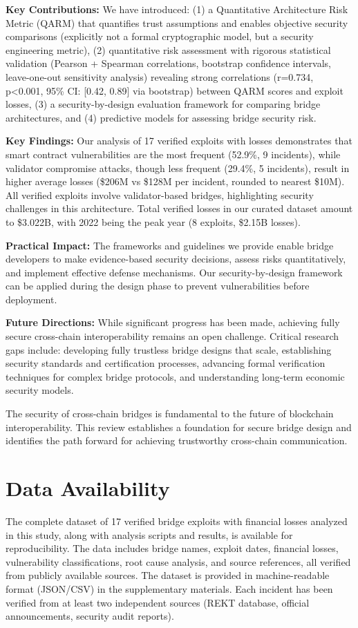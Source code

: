\documentclass[runningheads]{llncs}
\begin{document}
\textbf{Key Contributions:} We have introduced: (1) a Quantitative Architecture Risk Metric (QARM) that quantifies trust assumptions and enables objective security comparisons (explicitly not a formal cryptographic model, but a security engineering metric), (2) quantitative risk assessment with rigorous statistical validation (Pearson + Spearman correlations, bootstrap confidence intervals, leave-one-out sensitivity analysis) revealing strong correlations (r=0.734, p<0.001, 95\% CI: [0.42, 0.89] via bootstrap) between QARM scores and exploit losses, (3) a security-by-design evaluation framework for comparing bridge architectures, and (4) predictive models for assessing bridge security risk.

\textbf{Key Findings:} Our analysis of 17 verified exploits with losses demonstrates that smart contract vulnerabilities are the most frequent (52.9\%, 9 incidents), while validator compromise attacks, though less frequent (29.4\%, 5 incidents), result in higher average losses (\$206M vs \$128M per incident, rounded to nearest \$10M). All verified exploits involve validator-based bridges, highlighting security challenges in this architecture. Total verified losses in our curated dataset amount to \$3.022B, with 2022 being the peak year (8 exploits, \$2.15B losses).

\textbf{Practical Impact:} The frameworks and guidelines we provide enable bridge developers to make evidence-based security decisions, assess risks quantitatively, and implement effective defense mechanisms. Our security-by-design framework can be applied during the design phase to prevent vulnerabilities before deployment.

\textbf{Future Directions:} While significant progress has been made, achieving fully secure cross-chain interoperability remains an open challenge. Critical research gaps include: developing fully trustless bridge designs that scale, establishing security standards and certification processes, advancing formal verification techniques for complex bridge protocols, and understanding long-term economic security models.

The security of cross-chain bridges is fundamental to the future of blockchain interoperability. This review establishes a foundation for secure bridge design and identifies the path forward for achieving trustworthy cross-chain communication.

\section*{Data Availability}
The complete dataset of 17 verified bridge exploits with financial losses analyzed in this study, along with analysis scripts and results, is available for reproducibility. The data includes bridge names, exploit dates, financial losses, vulnerability classifications, root cause analysis, and source references, all verified from publicly available sources. The dataset is provided in machine-readable format (JSON/CSV) in the supplementary materials. Each incident has been verified from at least two independent sources (REKT database, official announcements, security audit reports).
\end{document}
